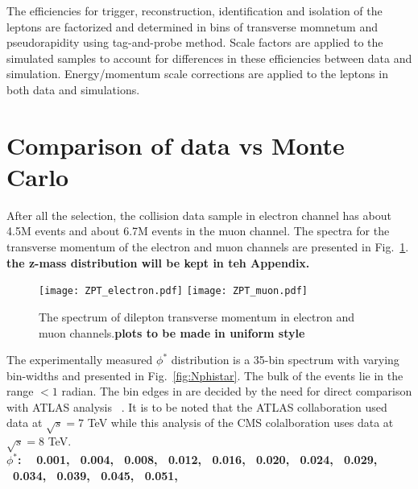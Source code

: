 The efficiencies for   trigger, reconstruction, identification and isolation of the leptons are factorized and determined  in bins of transverse momnetum and pseudorapidity using tag-and-probe method. Scale factors are applied to the simulated samples to account for differences in these efficiencies between data and simulation. Energy/momentum scale corrections are applied to the leptons in both data and simulations.

\section{Comparison of data vs Monte Carlo}
\label{sec:spectra}
After all the selection, the collision data sample in electron channel has about 4.5M events and about 6.7M events in the muon channel. The spectra for  the transverse momentum of the electron and muon channels are presented in Fig.~\ref{fig:zPt}. \\
{\bf the z-mass distribution will be kept in teh Appendix.}

\begin{figure}[hbtp]
  \begin{center}
    \texttt{[image: ZPT\_electron.pdf]}
    \texttt{[image: ZPT\_muon.pdf]}
    \caption{The spectrum of dilepton transverse momentum in electron and muon channels.{\bf plots to be made in uniform style}}
    \label{fig:zPt}
  \end{center}
\end{figure}


The experimentally measured $\phi^*$ distribution is a 35-bin spectrum with varying bin-widths and presented in Fig.~\ref{fig:Nphistar}. The bulk of the events lie in the range \phistar$< 1$ radian. 
The bin edges in \phistar are decided by the need for direct comparison with ATLAS analysis ~\cite{Aad:2012wfa}.  It is to be noted that  the ATLAS collaboration  used data at $\sqrt s = 7$ TeV while this analysis of the CMS colalboration uses data at $\sqrt s = 8$ TeV. \\
{\bf $\phi^*$: ~ 0.001, ~0.004, ~0.008, ~0.012, ~0.016, ~0.020, ~0.024, ~0.029, 
~0.034, ~0.039, ~0.045, ~0.051, }\\
\indent {}\\
\indent {}\\


